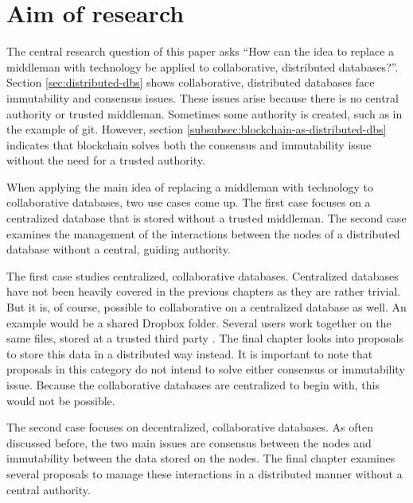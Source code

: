 \chapter{Aim of research}

\iffalse
- start with consensus and consistency in col. distr. dbs => because no central authority
- pivot into main idea: have technology replace an indispensable middleman. As discussed in \ref{subsec:examples-distributed-dbs}, blockchains solve both issues very well. 
- to apply the main idea to collaborative databases: two approaches. First a centralized collaborative database can be stored without a middleman. Second, the interaction between a nodes of a distributed collaborative database can be managed without a middleman
- For the first approach, the final chapter looks into proposals to store data in a distributed manner. Every proposal is examined on advantages, disadvantages, viability and current implementations.
- Concerning the second approach, the last chapter focuses on proposals to manage the interaction 
\fi

The central research question of this paper asks ``How can the idea to replace a middleman with technology be applied to collaborative, distributed databases?''. Section \ref{sec:distributed-dbs} shows collaborative, distributed databases face immutability and consensus issues. These issues arise because there is no central authority or trusted middleman. Sometimes some authority is created, such as in the example of git. However, section \ref{subsubsec:blockchain-as-distributed-dbs} indicates that blockchain solves both the consensus and immutability issue without the need for a trusted authority.

When applying the main idea of replacing a middleman with technology to collaborative databases, two use cases come up. The first case focuses on a centralized database that is stored without a trusted middleman. The second case examines the management of the interactions between the nodes of a distributed database without a central, guiding authority.

The first case studies centralized, collaborative databases. Centralized databases have not been heavily covered in the previous chapters as they are rather trivial. But it is, of course, possible to collaborative on a centralized database as well. An example would be a shared Dropbox folder. Several users work together on the same files, stored at a trusted third party \cite{dropbox-sharing}. The final chapter looks into proposals to store this data in a distributed way instead. It is important to note that proposals in this category do not intend to solve either consensus or immutability issue. Because the collaborative databases are centralized to begin with, this would not be possible.

The second case focuses on decentralized, collaborative databases. As often discussed before, the two main issues are consensus between the nodes and immutability between the data stored on the nodes. The final chapter examines several proposals to manage these interactions in a distributed manner without a central authority.


